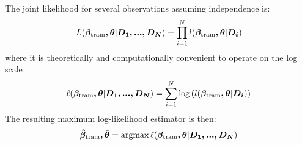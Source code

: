 \documentclass[11pt,a4paper,twoside]{book}\usepackage[]{graphicx}\usepackage[]{xcolor}
\begin{document}
The joint likelihood for several observations assuming independence is:
\begin{align*}
L(\boldsymbol{\beta_{\text{tram}},\theta}|\boldsymbol{D_1,...,D_N})=\prod_{i=1}^N l(\boldsymbol{\beta_{\text{tram}},\theta}|\boldsymbol{D_i})
\end{align*}
where it is theoretically and computationally convenient to operate on the log scale
\begin{align*}
\ell(\boldsymbol{\beta_{\text{tram}},\theta}|\boldsymbol{D_1,...,D_N})=\sum_{i=1}^N \log\left(l(\boldsymbol{\beta_{\text{tram}},\theta}|\boldsymbol{D_i})\right)
\end{align*}
The resulting maximum log-likelihood estimator is then:
\begin{align*}
\boldsymbol{\hat{\beta}_{\text{tram}},\hat\theta}=\operatorname*{argmax} \ell(\boldsymbol{\beta_{\text{tram}},\theta}|\boldsymbol{D_1,...,D_N})
\end{align*}

% 
\end{document}
